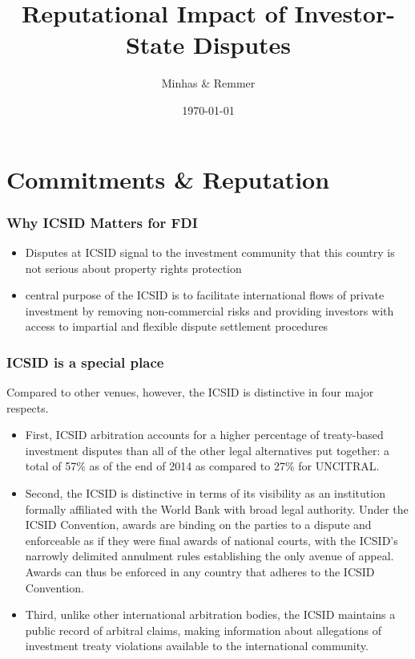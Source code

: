 \documentclass[10pt]{beamer}
\title[Contingent Institutions \hspace{14em} \insertframenumber/
\inserttotalframenumber]{Reputational Impact of Investor-State Disputes}
\author{Minhas \& Remmer}
\institute[Duke University]
{
{\emph{sfm12@duke.edu}} \\
\medskip
Duke University 
}
\date{\today}
\begin{document}
\begin{frame}
\titlepage
\end{frame}

\section{Commitments \& Reputation}

\begin{frame}
\frametitle{Why ICSID Matters for FDI}

\begin{itemize}
	\item Disputes at ICSID signal to the investment community that this country is not serious about property rights protection
	\item central purpose of the ICSID is to facilitate international flows of private investment by removing non-commercial risks and providing investors with access to impartial and flexible dispute settlement procedures
\end{itemize}

\end{frame}

\begin{frame}
\frametitle{ICSID is a special place}

Compared to other venues, however, the ICSID is distinctive in four major respects. 

\begin{itemize}
	\item First, ICSID arbitration accounts for a higher percentage of treaty-based investment disputes than all of the other legal alternatives put together: a total of 57\% as of the end of 2014 as compared to 27\% for UNCITRAL.
	\item  Second, the ICSID is distinctive in terms of its visibility as an institution formally affiliated with the World Bank with broad legal authority. Under the ICSID Convention, awards are binding on the parties to a dispute and enforceable as if they were final awards of national courts, with the ICSID’s narrowly delimited annulment rules establishing the only avenue of appeal. Awards can thus be enforced in any country that adheres to the ICSID Convention. 
	\item Third, unlike other international arbitration bodies, the ICSID maintains a public record of arbitral claims, making information about allegations of investment treaty violations available to the international community. 
\end{itemize}

\end{frame}
\end{document}
